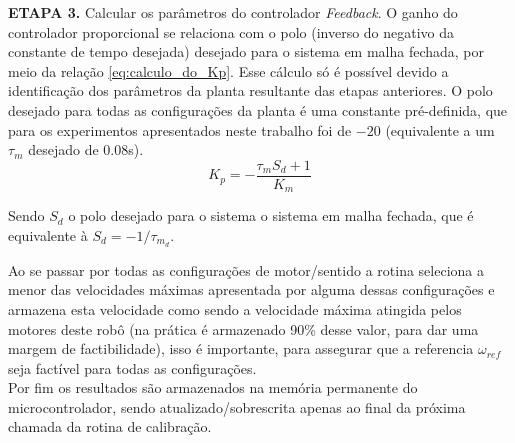 \textbf{ETAPA 3.} Calcular os parâmetros do controlador \textit{Feedback}. O ganho do controlador proporcional se relaciona com o polo (inverso do negativo da constante de tempo desejada) desejado para o sistema em malha fechada, por meio da relação \ref{eq:calculo_do_Kp}. Esse cálculo só é possível devido a identificação dos parâmetros da planta resultante das etapas anteriores. O polo desejado para todas as configurações da planta é uma constante pré-definida, que para os experimentos apresentados neste trabalho foi de $-20$ (equivalente a um $\tau_m$ desejado de 0.08s).\\

\begin{equation}
    K_p = -\frac{\tau_m S_d + 1}{K_m}
    \label{eq:calculo_do_Kp}
\end{equation}

Sendo $S_d$ o polo desejado para o sistema o sistema em malha fechada, que é equivalente à $S_d = -1/\tau_{m_{d}}$.
    

Ao se passar por todas as configurações de motor/sentido a rotina seleciona a menor das velocidades máximas apresentada por alguma dessas configurações e armazena esta velocidade como sendo a velocidade máxima atingida pelos motores deste robô (na prática é armazenado 90\% desse valor, para dar uma margem de factibilidade), isso é importante, para assegurar que a referencia $\omega_{ref}$ seja factível para todas as configurações. \\

Por fim os resultados são armazenados na memória permanente do microcontrolador, sendo atualizado/sobrescrita apenas ao final da próxima chamada da rotina de calibração.